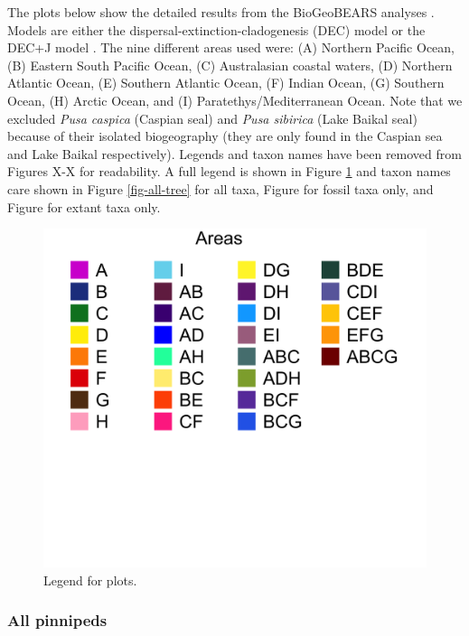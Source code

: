 \documentclass[a4paper, 12pt]{article}
\begin{document}
The plots below show the detailed results from the BioGeoBEARS analyses \cite{matzke2013probabilistic}. Models are either the dispersal-extinction-cladogenesis (DEC) model \cite{ree2008maximum} or the DEC+J model \cite{matzke2014model}. 
The nine different areas used were: (A) Northern Pacific Ocean, (B) Eastern South Pacific Ocean, (C) Australasian coastal waters, (D) Northern Atlantic Ocean, (E) Southern Atlantic Ocean, (F) Indian Ocean, (G) Southern Ocean, (H) Arctic Ocean, and (I) Paratethys/Mediterranean Ocean. Note that we excluded \textit{Pusa caspica} (Caspian seal) and \textit{Pusa sibirica} (Lake Baikal seal) because of their isolated biogeography (they are only found in the Caspian sea and Lake Baikal respectively). 
Legends and taxon names have been removed from Figures X-X for readability. 
A full legend is shown in Figure \ref{fig-legend} and taxon names care shown in Figure \ref{fig-all-tree} for all taxa, Figure %
for fossil taxa only, and Figure %
for extant taxa only.

\begin{figure}[H]
 \centering
  \includegraphics[width = \linewidth]{figures/BGB-legend.png}
  \caption{Legend for plots.}
  \label{fig-legend}
\end{figure} 

\subsubsection{All pinnipeds}
\end{document}
